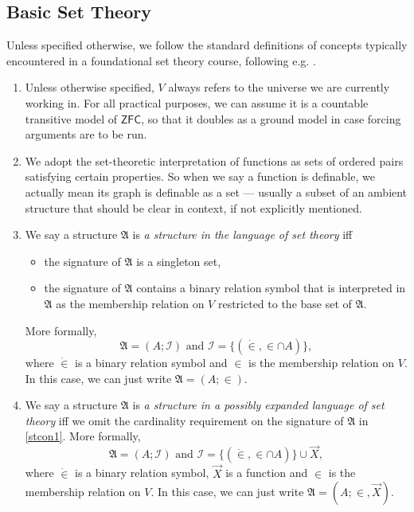 \documentclass[12pt]{article}
\numberwithin{equation}{section}
\begin{document}
\subsection{Basic Set Theory}

Unless specified otherwise, we follow the standard definitions of concepts typically encountered in a foundational set theory course, following e.g. \cite{jechhrbacek}.

\begin{con}
\leavevmode
\begin{enumerate}[label=(\arabic*)]
    \item Unless otherwise specified, $V$ always refers to the universe we are currently working in. For all practical purposes, we can assume it is a countable transitive model of $\mathsf{ZFC}$, so that it doubles as a ground model in case forcing arguments are to be run.
    \item We adopt the set-theoretic interpretation of functions as sets of ordered pairs satisfying certain properties. So when we say a function is definable, we actually mean its graph is definable as a set --- usually a subset of an ambient structure that should be clear in context, if not explicitly mentioned.
    \item\label{stcon1} We say a structure $\mathfrak{A}$ is \emph{a structure in the language of set theory} iff 
    \begin{itemize}
        \item the signature of $\mathfrak{A}$ is a singleton set,
        \item the signature of $\mathfrak{A}$ contains a binary relation symbol that is interpreted in $\mathfrak{A}$ as the membership relation on $V$ restricted to the base set of $\mathfrak{A}$.
    \end{itemize}
    More formally, $$\mathfrak{A} = (A; \mathcal{I}) \text{ and } \mathcal{I} = \{(\dot{\in}, \in \cap A)\},$$ where $\dot{\in}$ is a binary relation symbol and $\in$ is the membership relation on $V$. In this case, we can just write $\mathfrak{A} = (A; \in)$.
    \item We say a structure $\mathfrak{A}$ is \emph{a structure in a possibly expanded language of set theory} iff we omit the cardinality requirement on the signature of $\mathfrak{A}$ in \ref{stcon1}. More formally, $$\mathfrak{A} = (A; \mathcal{I}) \text{ and } \mathcal{I} = \{(\dot{\in}, \in \cap A)\} \cup \Vec{X},$$ where $\dot{\in}$ is a binary relation symbol, $\Vec{X}$ is a function and $\in$ is the membership relation on $V$. In this case, we can just write $\mathfrak{A} = (A; \in, \Vec{X})$.

\end{enumerate}
\end{con}
\end{document}
